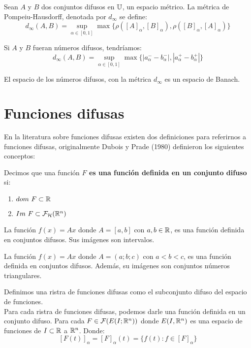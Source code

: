 \begin{definicion}
	\label{def:metricadifusa}
	Sean $A$ y $B$ dos conjuntos difusos en $\mathbb U$, un espacio métrico. La métrica de Pompeiu-Hausdorff, denotada por $d_\infty$ se define:
	\[
		d_\infty(A, B) = \sup\limits_{\alpha \in [0, 1]} \max\{\rho([A]_\alpha, [B]_\alpha), \rho([B]_\alpha,  [A]_\alpha)\}
	\]
	
	Si $A$ y $B$ fueran números difusos, tendríamos:
	\[
		d_\infty(A, B) = \sup\limits_{\alpha \in [0, 1]} \max\{|a_\alpha^- - b_\alpha^-|, |a_\alpha^+ - b_\alpha^+|\}
	\]
\end{definicion}

\begin{teorema}
	\label{teorema:banach}
	El espacio de los números difusos, con la métrica $d_\infty$ es un espacio de Banach.
\end{teorema}

\section{Funciones difusas}
En la literatura sobre funciones difusas existen dos definiciones para referirnos a funciones difusas, originalmente Dubois y Prade (1980) definieron los siguientes conceptos:

\begin{definicion}
	\label{def:fizzusetvaluedfunc} Decimos que una función \textbf{$F$ es una función definida en un conjunto difuso} si:
	\begin{enumerate}
		\item $dom ~ F \subset \mathbb R$
		\item $Im ~ F \subset \mathcal{F}_\mathcal{H}(\mathbb R^n)$
	\end{enumerate}
\end{definicion}

\begin{ejemplo}
	La función $f(x) = A x$ donde $A=[a, b]$ con $a, b \in \mathbb R$, es una función definida en conjuntos difusos. Sus imágenes son intervalos.
\end{ejemplo}

\begin{ejemplo}
	La función $f(x) = A x$ donde $A=(a;b;c)$ con $a<b<c$, es una función definida en conjuntos difusos. Además, su imágenes son conjuntos números triangulares.
\end{ejemplo}

\iffalse
\begin{definicion}
	Definimos una ristra de funciones difusas como el subconjunto difuso del espacio de funciones. \\
	Para cada ristra de funciones difusas, podemos darle una función definida en un conjunto difuso. Para cada $F \in \mathcal{F}(E(I; \mathbb R^n))$ donde $E(I, \mathbb R^n)$ es una espacio de funciones de $I \subset \mathbb R$ a $\mathbb R^n$. Donde:
	\[
		[F(t)]_\alpha = [F]_\alpha(t) = \{f(t) : f \in [F]_\alpha\}
	\]
\end{definicion}

